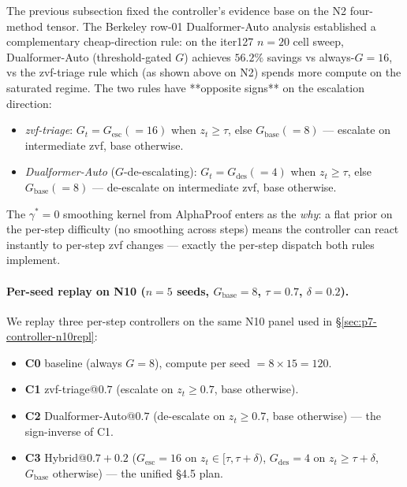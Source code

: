The previous subsection fixed the controller's evidence base on the N2
four-method tensor. The Berkeley row-01 Dualformer-Auto analysis
\citep{su2024dualformer} established a complementary cheap-direction rule:
on the iter127 $n{=}20$ cell sweep, Dualformer-Auto (threshold-gated
$G$) achieves $56.2\%$ savings vs always-$G{=}16$, vs the
zvf-triage rule which (as shown above on N2) spends more compute on
the saturated regime. The two rules have **opposite signs** on the
escalation direction:
\begin{itemize}
\item \emph{zvf-triage}: $G_t = G_{\mathrm{esc}} (=16)$ when $z_t \geq \tau$, else $G_{\mathrm{base}} (=8)$ --- escalate on intermediate zvf, base otherwise.
\item \emph{Dualformer-Auto} ($G$-de-escalating): $G_t = G_{\mathrm{des}} (=4)$ when $z_t \geq \tau$, else $G_{\mathrm{base}} (=8)$ --- de-escalate on intermediate zvf, base otherwise.
\end{itemize}
The $\gamma^{*}{=}0$ smoothing kernel from AlphaProof \citep{alphaproof2025nature}
enters as the \emph{why}: a flat prior on the per-step difficulty (no smoothing
across steps) means the controller can react instantly to per-step zvf changes
--- exactly the per-step dispatch both rules implement.

\paragraph{Per-seed replay on N10 ($n{=}5$ seeds, $G_{\mathrm{base}}{=}8$, $\tau{=}0.7$, $\delta{=}0.2$).}
We replay three per-step controllers on the same N10 panel used in
\S\ref{sec:p7-controller-n10repl}:
\begin{itemize}
\item \textbf{C0} baseline (always $G{=}8$), compute per seed $= 8 \times 15 = 120$.
\item \textbf{C1} zvf-triage@$0.7$ (escalate on $z_t \geq 0.7$, base otherwise).
\item \textbf{C2} Dualformer-Auto@$0.7$ (de-escalate on $z_t \geq 0.7$, base otherwise) --- the sign-inverse of C1.
\item \textbf{C3} Hybrid@$0.7{+}0.2$ ($G_{\mathrm{esc}}{=}16$ on $z_t \in [\tau, \tau{+}\delta)$, $G_{\mathrm{des}}{=}4$ on $z_t \geq \tau{+}\delta$, $G_{\mathrm{base}}$ otherwise) --- the unified §4.5 plan.
\end{itemize}

